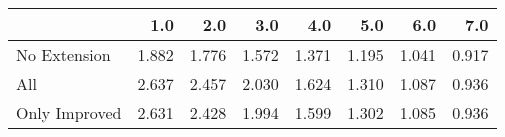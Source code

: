 \begin{tabular}{lrrrrrrr}
\toprule
{} &   1.0 &   2.0 &   3.0 &   4.0 &   5.0 &   6.0 &   7.0 \\
\midrule
No Extension  & 1.882 & 1.776 & 1.572 & 1.371 & 1.195 & 1.041 & 0.917 \\
All           & 2.637 & 2.457 & 2.030 & 1.624 & 1.310 & 1.087 & 0.936 \\
Only Improved & 2.631 & 2.428 & 1.994 & 1.599 & 1.302 & 1.085 & 0.936 \\
\bottomrule
\end{tabular}

